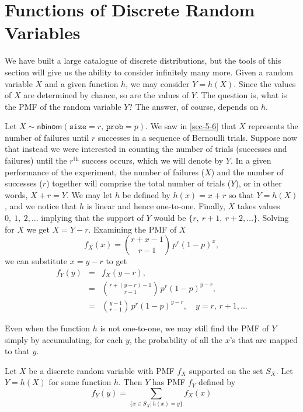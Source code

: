 \section{Functions of Discrete Random Variables}
\label{sec-5-7}

We have built a large catalogue of discrete distributions, but the
tools of this section will give us the ability to consider infinitely
many more. Given a random variable \(X\) and a given function \(h\),
we may consider \(Y=h(X)\). Since the values of \(X\) are determined
by chance, so are the values of \(Y\). The question is, what is the
PMF of the random variable \(Y\)? The answer, of course, depends on
\(h\).


Let \(X\sim\mathsf{nbinom}(\mathtt{size}=r,\,\mathtt{prob}=p)\). We
saw in \ref{sec-5-6} that \(X\) represents the number
of failures until \(r\) successes in a sequence of Bernoulli
trials. Suppose now that instead we were interested in counting the
number of trials (successes and failures) until the
\(r^{\mathrm{th}}\) success occurs, which we will denote by \(Y\). In
a given performance of the experiment, the number of failures (\(X\))
and the number of successes (\(r\)) together will comprise the total
number of trials (\(Y\)), or in other words, \(X+r=Y\). We may let
\(h\) be defined by \(h(x)=x+r\) so that \(Y=h(X)\), and we notice
that \(h\) is linear and hence one-to-one. Finally, \(X\) takes values
\(0,\ 1,\ 2,\ldots\) implying that the support of \(Y\) would be \(\{
r,\ r+1,\ r+2,\ldots \}\). Solving for \(X\) we get
\(X=Y-r\). Examining the PMF of \(X\)
\begin{equation}
f_{X}(x)={r+x-1 \choose r-1}\, p^{r}(1-p)^{x},
\end{equation}
we can substitute \( x = y - r \) to get
\begin{eqnarray*}
f_{Y}(y) & = & f_{X}(y-r),\\
 & = & {r+(y-r)-1 \choose r-1}\, p^{r}(1-p)^{y-r},\\
 & = & {y-1 \choose r-1}\, p^{r}(1-p)^{y-r},\quad y=r,\, r+1,\ldots
\end{eqnarray*}

Even when the function \(h\) is not one-to-one, we may still find the
PMF of \(Y\) simply by accumulating, for each \(y\), the probability
of all the \(x\)'s that are mapped to that \(y\).
\begin{prop}
Let \(X\) be a discrete random variable with PMF \(f_{X}\) supported
on the set \(S_{X}\). Let \(Y=h(X)\) for some function \(h\). Then
\(Y\) has PMF \(f_{Y}\) defined by
\begin{equation}
f_{Y}(y)=\sum_{\{x\in S_{X}|\, h(x)=y\}}f_{X}(x)
\end{equation}
\end{prop}


